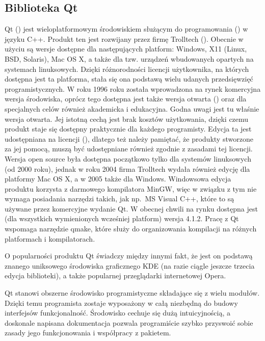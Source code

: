 \subsection{Biblioteka Qt}\label{qt}

Qt (\cite{qt}) jest wieloplatformowym środowiskiem służącym do programowania  () 
w języku C++. Produkt ten jest rozwijany przez firmę Trolltech (\cite{trolltech}). Obecnie w użyciu są wersje dostępne dla 
następujących platform:  Windows, X11 (Linux, BSD, Solaris), Mac OS X, a także dla tzw. urządzeń wbudowanych opartych na systemach linuksowych. 
Dzięki różnorodności licencji użytkownika, na których dostępna jest ta platforma, stała się ona podstawą wielu udanych przedsięwzięć programistycznych. 
W roku 1996 roku została wprowadzona na rynek komercyjna wersja środowiska, oprócz tego dostępna jest także wersja otwarta () oraz 
dla specjalnych celów również akademicka i edukacyjna. Godna uwagi jest tu właśnie wersja otwarta. Jej istotną cechą jest brak kosztów użytkowania, 
dzięki czemu produkt staje się dostępny praktycznie dla każdego programisty. Edycja ta jest udostępniana na licencji  (), dlatego też należy pamiętać, że produkty stworzone za jej pomocą, muszą być udostępniane również zgodnie z zasadami tej licencji. 
Wersja open source była dostępna początkowo tylko dla systemów linuksowych (od 2000 roku), jednak w roku 2004 firma Trolltech wydała również 
edycję dla platformy Mac OS X, a w 2005 także dla Windows. Windowsowa edycja produktu korzysta z darmowego kompilatora MinGW, więc w związku 
z tym nie wymaga posiadania narzędzi takich, jak np.~MS Visual C++, które to są używane przez komercyjne wydanie Qt. W obecnej chwili 
na rynku dostępna jest (dla wszystkich wymienionych wcześniej platform) wersja 4.1.2. Pracę z Qt wspomaga narzędzie qmake, które służy do organizowania 
kompilacji na różnych platformach i kompilatorach.

O popularności produktu Qt świadczy między innymi fakt, że jest on podstawą znanego uniksowego środowiska graficznego KDE (na razie ciągle jeszcze 
trzecia edycja biblioteki), a także popularnej przeglądarki internetowej Opera.

Qt stanowi obszerne środowisko programistyczne składające się z wielu modułów. Dzięki temu programista zostaje wyposażony w całą niezbędną do budowy interfejsów 
funkcjonalność. Środowisko cechuje się dużą intuicyjnością, a doskonale napisana dokumentacja pozwala programiście szybko przyswoić sobie 
zasady jego funkcjonowania i współpracy z pakietem.

